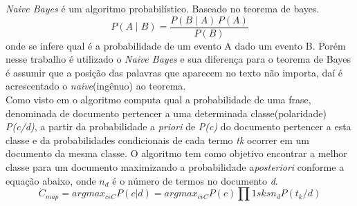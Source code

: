 \emph{Naive Bayes} é um algoritmo probabilístico. Baseado no teorema de bayes. $$ P(A \mid B) = \frac{P(B \mid A) \, P(A)}{P(B)} $$ onde se infere qual é a probabilidade de um evento A dado um evento B. Porém nesse trabalho é utilizado o \emph{Naive Bayes} e sua diferença para o teorema de Bayes é assumir que a posição das palavras que aparecem no texto não importa, daí é acrescentado o \emph{naive}(ingênuo) ao teorema.
\\ Como visto em \cite{lucca2013implementaccao} o algoritmo computa qual a probabilidade de uma frase, denominada de documento pertencer a uma determinada classe(polaridade) \emph{P(c/d)}, a partir da probabilidade a \emph{priori} de \emph{P(c)} do documento pertencer a esta classe e da probabilidades condicionais de cada termo \emph{tk} ocorrer em um documento da mesma classe. O algoritmo tem como objetivo encontrar a melhor classe para um documento maximizando a probabilidade a\emph{posteriori} conforme a equação abaixo, onde $ n_{d} $ é o número de termos no documento \emph{d}. $$ C_{map}= argmax_{c \epsilon C}P(c|d)=argmax_{c \epsilon C}P(c)\prod 1sksn_{d}P(t_{k}/d) $$